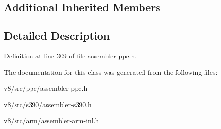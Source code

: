 \subsection*{Additional Inherited Members}


\subsection{Detailed Description}


Definition at line 309 of file assembler-\/ppc.\+h.



The documentation for this class was generated from the following files\+:\begin{DoxyCompactItemize}
\item 
v8/src/ppc/assembler-\/ppc.\+h\item 
v8/src/s390/assembler-\/s390.\+h\item 
v8/src/arm/assembler-\/arm-\/inl.\+h\end{DoxyCompactItemize}
